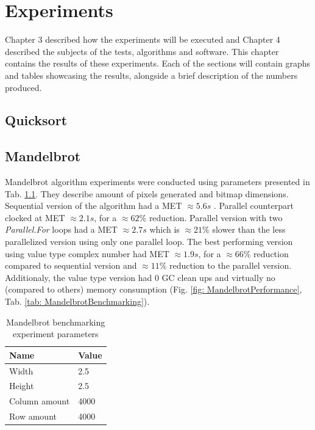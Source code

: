 \clearpage
\chapter{Experiments}
Chapter 3 described how the experiments will be executed and Chapter 4 described the subjects of the tests, algorithms and software. This chapter contains the results of these experiments. Each of the sections will contain graphs and tables showcasing the results, alongside a brief description of the numbers produced. 
\clearpage
\section{Quicksort}

\clearpage
\section{Mandelbrot}
Mandelbrot algorithm experiments were conducted using parameters presented in Tab. \ref{tab: MandelbrotParameters}. They describe amount of pixels generated and bitmap dimensions.
Sequential version of the algorithm had a MET  $\approx 5.6s$ . Parallel counterpart clocked at MET  $\approx 2.1s$, for a $\approx 62\%$ reduction. Parallel version with two \emph{Parallel.For} loops had a MET $\approx 2.7s$ which is $\approx 21\%$ slower than the less parallelized version using only one parallel loop. The best performing version using value type complex number had MET $\approx 1.9s$, for a $\approx 66\%$  reduction compared to sequential version and $\approx 11\%$  reduction to the parallel version. Additionaly, the value type version had 0 GC clean ups and virtually no (compared to others) memory consumption (Fig. \ref{fig: MandelbrotPerformance}, Tab. \ref{tab: MandelbrotBenchmarking}).

\begin{table}[!ht]
    \centering
    \caption{Mandelbrot benchmarking experiment parameters}
		\label{tab: MandelbrotParameters}
    \begin{tabular}{p{3cm}p{3cm}}
			\toprule
			\bfseries Name 	&
			\bfseries Value \\
			\midrule
			Width & 2.5 \\
			Height & 2.5 \\
			Column amount & 4000 \\ 
			Row amount  & 4000 \\	
			\bottomrule
    \end{tabular}
\end{table}

